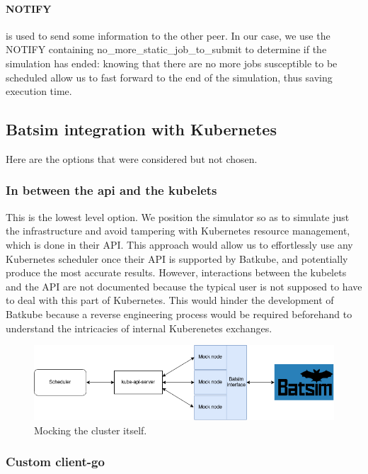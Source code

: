 \paragraph{NOTIFY}
is used to send some information to the other peer. In our case, we use the
NOTIFY containing no\_more\_static\_job\_to\_submit to determine if the
simulation has ended: knowing that there are no more jobs susceptible to be
scheduled allow us to fast forward to the end of the simulation, thus saving
execution time.\\

\subsection{Batsim integration with Kubernetes} \label{sec:imp_levels}

Here are the options that were considered but not chosen.

\subsubsection{In between the api and the kubelets}

This is the lowest level option. We position the simulator so as to simulate
just the infrastructure and avoid tampering with Kubernetes resource
management, which is done in their API. This approach would allow us to
effortlessly use any Kubernetes scheduler once their API is supported by
Batkube, and potentially produce the most accurate results. However,
interactions between the kubelets and the API are not documented because the
typical user is not supposed to have to deal with this part of Kubernetes. This
would hinder the development of Batkube because a reverse engineering process
would be required beforehand to understand the intricacies of internal
Kuberenetes exchanges.

\begin{figure}[h]
	\centering
	\includegraphics[width=\textwidth]{imgs/architecture-as-kubelets.png}
	\caption{Mocking the cluster itself.}
	\label{fig:mock_nodes}
\end{figure}

\subsubsection{Custom client-go}

